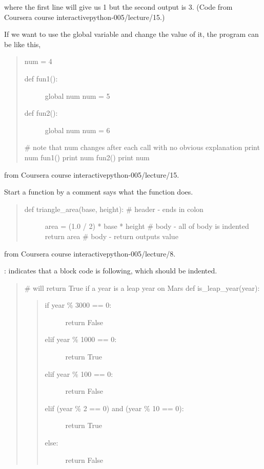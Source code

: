 \documentclass[letterpaper,12pt,english]{sphinxmanual}
\begin{document}
where the first line will give us 1 but the second output is 3. (Code from Coursera course interactivepython-005/lecture/15.)

If we want to use the global variable and change the value of it, the program can be like this,
\begin{quote}

num = 4
\begin{description}
\item[{def fun1():}] \leavevmode
global num
num = 5

\item[{def fun2():}] \leavevmode
global num
num = 6

\end{description}

\# note that num changes after each call with no obvious explanation
print num
fun1()
print num
fun2()
print num
\end{quote}

from Coursera course interactivepython-005/lecture/15.

Start a function by a comment says what the function does.
\begin{quote}
\begin{description}
\item[{def triangle\_area(base, height):     \# header - ends in colon}] \leavevmode
area = (1.0 / 2) * base * height \# body - all of body is indented
return area                      \# body - return outputs value

\end{description}
\end{quote}

from Coursera course interactivepython-005/lecture/8.

\sphinxquotedblright{}:\sphinxquotedblright{}\sphinxquotedblright{} indicates that a block code is following, which should be indented.
\begin{quote}

\# will return True if a year is a leap year on Mars
def is\_leap\_year(year):
\begin{quote}
\begin{description}
\item[{if year \% 3000 == 0:}] \leavevmode
return False

\item[{elif year \% 1000 == 0:}] \leavevmode
return True

\item[{elif year \% 100 == 0:}] \leavevmode
return False

\item[{elif (year \% 2 == 0) and (year \% 10 == 0):}] \leavevmode
return True

\item[{else:}] \leavevmode
return False

\end{description}
\end{quote}
\end{quote}
\end{document}
